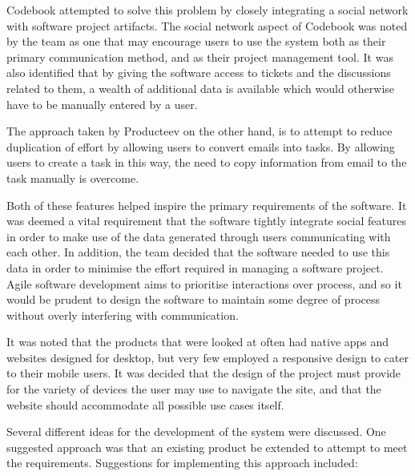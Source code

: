 \documentclass[a4paper]{l3proj}
\begin{document}
Codebook attempted to solve this problem by closely integrating a social network with software project artifacts. The social network aspect of Codebook was noted by the team as one that may encourage users to use the system both as their primary communication method, and as their project management tool. It was also identified that by giving the software access to tickets and the discussions related to them, a wealth of additional data is available which would otherwise have to be manually entered by a user.

The approach taken by Producteev on the other hand, is to attempt to reduce duplication of effort by allowing users to convert emails into tasks. By allowing users to create a task in this way, the need to copy information from email to the task manually is overcome.

Both of these features helped inspire the primary requirements of the software. It was deemed a vital requirement that the software tightly integrate social features in order to make use of the data generated through users communicating with each other. In addition, the team decided that the software needed to use this data in order to minimise the effort required in managing a software project. Agile software development aims to prioritise interactions over process, and so it would be prudent to design the software to maintain some degree of process without overly interfering with communication.

It was noted that the products that were looked at often had native apps and websites designed for desktop, but very few employed a responsive design to cater to their mobile users. It was decided that the design of the project must provide for the variety of devices the user may use to navigate the site, and that the website should accommodate all possible use cases itself.

Several different ideas for the development of the system were discussed. One suggested approach was that an existing product be extended to attempt to meet the requirements. Suggestions for implementing this approach included:
\end{document}

